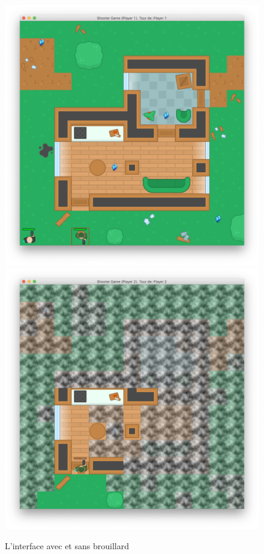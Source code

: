 \documentclass[a4paper,12pt]{article} %
\begin{document}
\begin{figure}[!h]
\centering
\includegraphics[scale=0.2]{images/interface.png}
\includegraphics[scale=0.2]{images/interfaceBrume.png}
\caption{L'interface avec et sans brouillard}
\end{figure}
\end{document}
